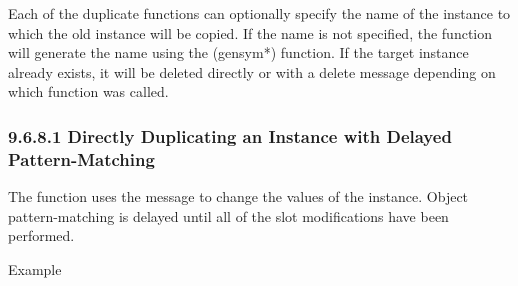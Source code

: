 \documentclass[letterpaper,10pt,english]{sphinxmanual}
\begin{document}
Each of the duplicate functions can optionally specify the name of the
instance to which the old instance will be copied. If the name is not
specified, the function will generate the name using the (gensym*)
function. If the target instance already exists, it will be deleted
directly or with a delete message depending on which function was
called.


\subsubsection{9.6.8.1 Directly Duplicating an Instance with Delayed Pattern-Matching}
\label{\detokenize{cool:directly-duplicating-an-instance-with-delayed-pattern-matching}}
The  function uses the 
message to change the values of the instance. Object pattern-matching is
delayed until all of the slot modifications have been performed.


\begin{sphinxVerbatim}[commandchars=\\\{\}]
  \PYG{p}{[} \PYG{p}{]} 
\end{sphinxVerbatim}

Example
\end{document}
